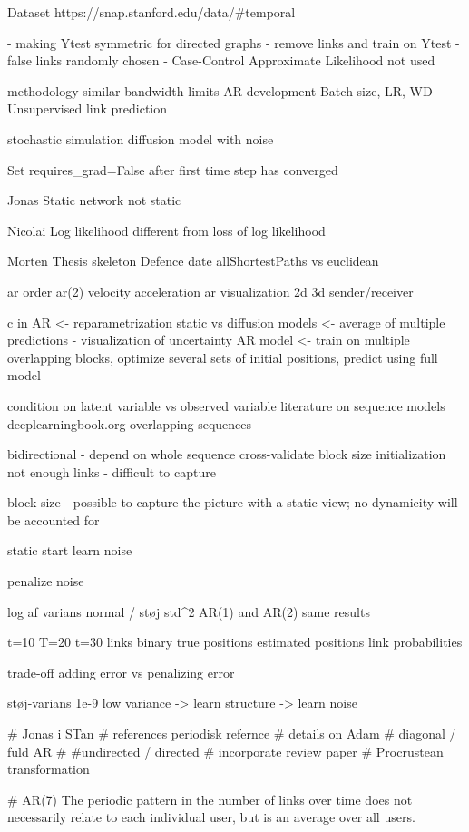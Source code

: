 Dataset https://snap.stanford.edu/data/#temporal

- making Ytest symmetric for directed graphs
- remove links and train on Ytest
- false links randomly chosen
- Case-Control Approximate Likelihood not used

methodology similar
bandwidth limits
AR development
Batch size, LR, WD
Unsupervised link prediction

stochastic simulation
diffusion model with noise

Set requires_grad=False after first time step has converged

Jonas
    Static network not static
    
Nicolai
    Log likelihood different from loss of log likelihood
    
Morten
    Thesis skeleton
    Defence date
    allShortestPaths vs euclidean


ar order
ar(2) velocity acceleration
ar visualization 2d 3d sender/receiver

c in AR <- reparametrization
static vs diffusion models <- average of multiple predictions - visualization of uncertainty
AR model <- train on multiple overlapping blocks, optimize several sets of initial positions, predict using full model

condition on latent variable vs observed variable
literature on sequence models deeplearningbook.org
overlapping sequences


bidirectional - depend on whole sequence
cross-validate block size
initialization
not enough links - difficult to capture 

block size - possible to capture the picture with a static view; no dynamicity will be accounted for


static start 
learn noise


penalize noise

log af varians normal / støj std^2
AR(1) and AR(2) same results

t=10 T=20 t=30
links binary
true positions
estimated positions
link probabilities

trade-off
adding error vs penalizing error

støj-varians 1e-9
low variance -> learn structure -> learn noise


        
        # Jonas i STan
        # references periodisk refernce
        # details on Adam
        # diagonal / fuld AR
        # #undirected / directed 
        # incorporate review paper
        # Procrustean transformation

# AR(7) The periodic pattern in the number of links over time does not necessarily relate to each individual user, but is an average over all users.